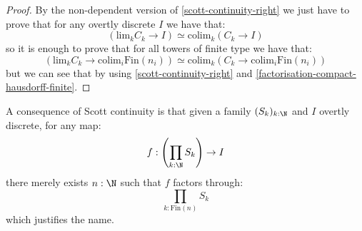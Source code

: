 \begin{proof}
By the non-dependent version of \cref{scott-continuity-right} we just have to prove that for any overtly discrete $I$ we have that:
\[(\mathrm{lim}_kC_k\to I) \simeq \mathrm{colim}_k(C_k\to I)\]
so it is enough to prove that for all towers of finite type we have that:
\[(\mathrm{lim}_kC_k\to \mathrm{colim}_i\mathrm{Fin}(n_i)) \simeq \mathrm{colim}_k(C_k\to \mathrm{colim}_i\mathrm{Fin}(n_i))\]
but we can see that by using \cref{scott-continuity-right} and \cref{factorisation-compact-hausdorff-finite}.
\end{proof}

\begin{remark}
A consequence of Scott continuity is that given a family $(S_k)_{k:\N}$ and $I$ overtly discrete, for any map:
\[f: \left(\prod_{k:\N} S_k\right) \to I\]
there merely exists $n:\N$ such that $f$ factors through:
\[\prod_{k:\mathrm{Fin}(n)} S_k\]
which justifies the name.
\end{remark}


